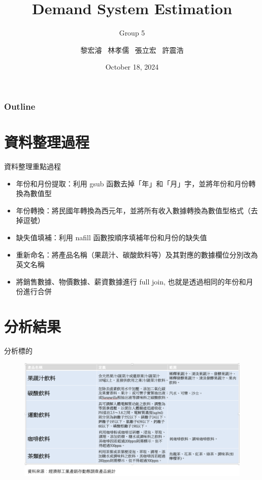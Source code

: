 \documentclass[12pt]{beamer}
\title[]  
{Demand System Estimation}
\subtitle[short subtitle]{Group 5}
\author{黎宏濬 \ 林孝儒 \ 張立宏 \ 許震浩}
\institute[short]{\inst{}Department of Agricultural Economics, NTU}
\date
 {October 18, 2024}
\begin{document}
\begin{frame}{}
    \titlepage
\end{frame}

\begin{frame}
    \frametitle{Outline}
    \tableofcontents[]
\end{frame}


\section{資料整理過程}

\begin{frame}{資料整理重點過程}
	\begin{itemize}
		\item 年份和月份提取：利用 gsub 函數去掉「年」和「月」字，並將年份和月份轉換為數值型
		\item 年份轉換：將民國年轉換為西元年，並將所有收入數據轉換為數值型格式（去掉逗號）
		\item 缺失值填補：利用 nafill 函數按順序填補年份和月份的缺失值
		\item 重新命名：將產品名稱（果蔬汁、碳酸飲料等）及其對應的數據欄位分別改為英文名稱  
		\item 將銷售數據、物價數據、薪資數據進行 full join, 也就是透過相同的年份和月份進行合併
	\end{itemize}
\end{frame}

\section{分析結果}

\begin{frame}{分析標的}
	\begin{figure}
		\centering
		\includegraphics[width=1\textwidth]{figures/fig.png}
	\end{figure}
\end{frame}
\end{document}
